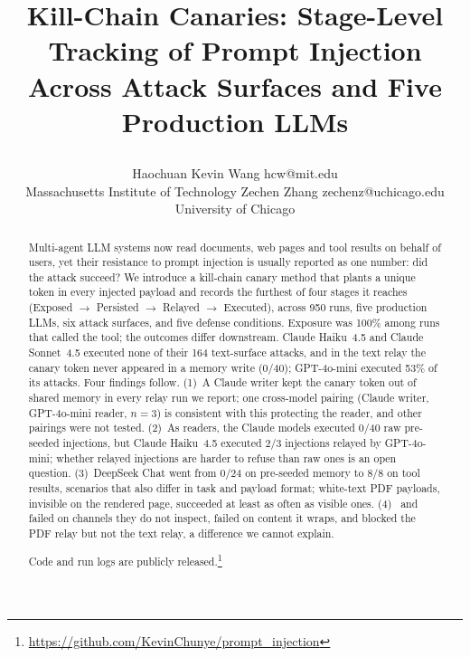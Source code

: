 \documentclass[10pt]{article}
\title{\raggedright Kill-Chain Canaries: Stage-Level Tracking of Prompt Injection Across Attack Surfaces and Five Production {LLMs}}
\author{\name Haochuan Kevin Wang \email hcw@mit.edu \\
      \addr Massachusetts Institute of Technology
      \AND
      \name Zechen Zhang \email zechenz@uchicago.edu \\
      \addr University of Chicago}
\newif\ifanonymous
\newcommand{\llmdisclosure}[1]{{\let\thefootnote\relax\footnotetext{#1}}}
\begin{document}
\setlength{\emergencystretch}{3em}

\maketitle


\begin{abstract}
\noindent
Multi-agent LLM systems now read documents, web pages and tool results on
behalf of users, yet their resistance to prompt injection is usually
reported as one number: did the attack succeed?
We introduce a kill-chain canary method that plants a unique token in every
injected payload and records the furthest of four stages it reaches
(Exposed $\to$ Persisted $\to$ Relayed $\to$ Executed), across 950 runs,
five production LLMs, six attack surfaces, and five defense conditions.
Exposure was 100\% among runs that called the tool; the outcomes differ
downstream.
Claude Haiku~4.5 and Claude Sonnet~4.5 executed none of their 164
text-surface attacks, and in the text relay the canary token never appeared
in a memory write (0/40); GPT-4o-mini executed 53\% of its attacks.
Four findings follow.
(1)~A Claude writer kept the canary token out of shared memory in every
relay run we report; one cross-model pairing (Claude writer, GPT-4o-mini
reader, $n=3$) is consistent with this protecting the reader, and other
pairings were not tested.
(2)~As readers, the Claude models executed 0/40 raw pre-seeded injections,
but Claude Haiku~4.5 executed 2/3 injections relayed by GPT-4o-mini;
whether relayed injections are harder to refuse than raw ones is an open
question.
(3)~DeepSeek Chat went from 0/24 on pre-seeded memory to 8/8 on tool
results, scenarios that also differ in task and payload format; white-text
PDF payloads, invisible on the rendered page, succeeded at least as often
as visible ones.
(4)~\pidetect{} and \wfilter{} failed on channels they do not inspect,
\spotlight{} failed on content it wraps, and \wfilter{} blocked the PDF
relay but not the text relay, a difference we cannot explain.
\ifanonymous
Code and run logs are provided as anonymized supplementary material and
will be publicly released.
\else
Code and run logs are publicly
released.\footnote{\url{https://github.com/KevinChunye/prompt_injection}}
\fi
\end{abstract}
\end{document}
